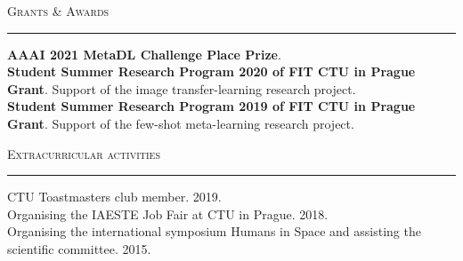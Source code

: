 \documentclass[10pt]{article}
\begin{document}
\begin{Large}
    \textsc{Grants \& Awards}
    \vspace{0.4em}
    \hrule
    \vspace{0.4em}
\end{Large}
\begin{normalsize}
    \textbf{AAAI 2021 MetaDL Challenge  Place Prize}.\\[0.2em]
    \textbf{Student Summer Research Program 2020 of FIT CTU in Prague Grant}. Support of the image transfer-learning research project.\\[0.2em]
    \textbf{Student Summer Research Program 2019 of FIT CTU in Prague Grant}. Support of the few-shot meta-learning research project.
\end{normalsize}
\vspace{20pt}


\begin{Large}
    \textsc{Extracurricular activities}
    \vspace{0.4em}
    \hrule
    \vspace{0.4em}
\end{Large}

\begin{normalsize}
    CTU Toastmasters club member. 2019.\\[0.2em]
    Organising the IAESTE Job Fair at CTU in Prague. 2018.\\[0.2em]
    Organising the international symposium Humans in Space and assisting the scientific committee. 2015.\\
\end{normalsize}

\end{document}
